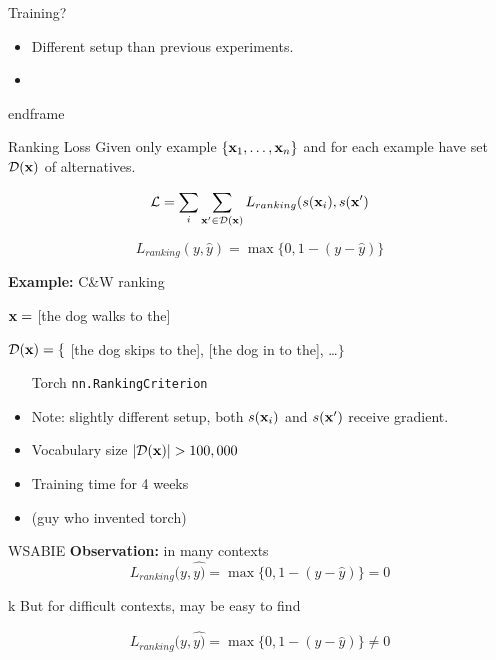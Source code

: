 \documentclass{beamer}
\begin{document}
\begin{frame}{Training?}
  \begin{itemize}
  \item Different setup than previous experiments.

    \air 
  \item 
  \end{itemize}
end{frame}


\begin{frame}{Ranking Loss}
  Given only example $\{ \mathbf{x}_1, \ldots, \mathbf{x}_n \}$ and for 
  each example have set $\mathcal{D}(\mathbf{x})$ of alternatives. 
  
  \[ \mathcal{L} = \sum_i \sum_{\mathbf{x}' \in \mathcal{D}(\mathbf{x})} L_{ranking}(s(\mathbf{x}_i), s(\mathbf{x}') \] 

  \[ L_{ranking}(y, \hat{y}) = \max\{0, 1 - (y - \hat{y}) \}   \] 

  \textbf{Example:} C\&W ranking

  $\mathbf{x} =$ [the dog walks to the] 

  $\mathcal{D}(\mathbf{x}) = \{$ [the dog skips to the], [the dog in to the], \ldots $\}$

  \begin{itemize}
  \item [Torch \texttt{nn.RankingCriterion}]
    \air 
  \item Note: slightly different setup, both $s(\mathbf{x}_i)$ and $s(\mathbf{x}')$ receive gradient.
  \end{itemize}
\end{frame}

\begin{frame}
  \begin{itemize}
  \item Vocabulary size $|\mathcal{D}(\mathbf{x})| > 100,000$
    \air 
    
  \item Training time for 4 weeks
    \air 

  \item (guy who invented torch)
  \end{itemize}
\end{frame}

\begin{frame}{WSABIE}
  \textbf{Observation:} in many contexts  
  \[ L_{ranking}(y, \hat{y)} = \max\{0, 1 - (y - \hat{y}) \} = 0 \]

  \air 
k
  But for difficult contexts, may be easy to find 

  \[ L_{ranking}(y, \hat{y)} = \max\{0, 1 - (y - \hat{y}) \} \neq 0 \]
  

\end{frame}
\end{frame}
\end{document}
